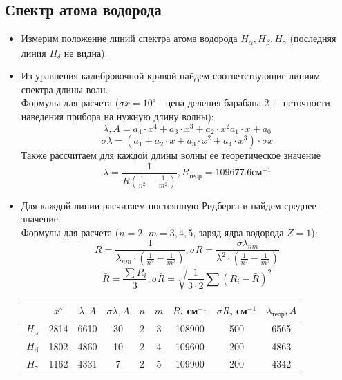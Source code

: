 \documentclass[a4paper,12pt]{article} %
\begin{document}
\subsection*{Спектр атома водорода}
\begin{itemize}
    \item Измерим положение линий спектра атома водорода $H_\alpha, H_\beta, H_\gamma$ (последняя линия $H_\delta$ не видна). 
    \item Из уравнения калибровочной кривой найдем соответствующие линиям спектра длины волн. \\
Формулы для расчета ($\sigma x = 10^{\circ}$ - цена деления барабана 2 + неточности наведения прибора на нужную длину волны):
\begin{equation*}
    \lambda, A  =  a_4 \cdot x^4 + a_3 \cdot x^3 + a_2  \cdot x^2  a_1 \cdot x + a_0 
\end{equation*}
\begin{equation*}
    \sigma \lambda = (a_1 + a_2 \cdot x + a_3 \cdot x^2 + a_4 \cdot x^3) \cdot \sigma x
\end{equation*}
Также рассчитаем для каждой длины волны ее теоретическое значение
\begin{equation*}
    \lambda = \frac{1}{R(\frac{1}{n^2} - \frac{1}{m^2})}, R_{\text{теор}} = 109677.6\text{см}^{-1}
\end{equation*}
\item Для каждой линии расчитаем постоянную Ридберга и найдем среднее значение.\\ Формулы для расчета ($n = 2$, $m = 3, 4, 5$, заряд ядра водорода $Z = 1$):
\begin{equation*}
    R = \frac{1}{\lambda_{nm} \cdot (\frac{1}{n^2} - \frac{1}{m^2})}, \sigma R = \frac{\sigma \lambda_{nm}}{\lambda^2 \cdot (\frac{1}{n^2} - \frac{1}{m^2})}
\end{equation*}
\begin{equation*}
    \bar R = \frac{\sum R_i}{3}, \sigma \bar R = \sqrt{\frac{1}{3\cdot 2} \sum (R_i - \bar R)^2}
\end{equation*}

\begin{table}[h!]
\centering
\begin{tabular}{|c|c|c|c|c|c|c|c|c|}
\hline
 & $x^{\circ}$ & $\lambda, A$& $\sigma \lambda, A$ & $n$ & $m$ & $R$, см$^{-1}$ & $\sigma R$, см$^{-1}$ & $\lambda_\text{теор}, A$ \\ \hline
$H_\alpha$ & 2814 & 6610 & 30 & 2 & 3 & 108900 & 500 & 6565 \\ \hline
$H_\beta$ & 1802 & 4860 & 10 & 2 & 4 & 109600 & 200 & 4863
\\ \hline
$H_\gamma$ & 1162 & 4331 & 7 & 2 & 5 & 109900 &  200 & 4342 \\ \hline
\end{tabular}
\end{table}
 



\end{itemize}
\end{document}
